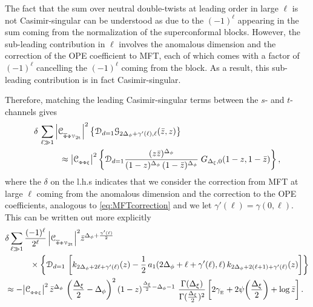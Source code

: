 \documentclass[11pt]{article}
\newcommand{\zb}{\bar{z}}
\newcommand{\Phib}{\overline{\Phi}}
\newcommand{\cope}[1]{\mathcal{C}_{_{#1}}}
\begin{document}
The fact that the sum over neutral double-twists at leading order in large $\ell$ is not Casimir-singular can be understood as due to the $(-1)^{\ell}$ appearing in the sum coming from the normalization of the superconformal blocks. However, the sub-leading contribution in $\ell$ involves the anomalous dimension and the correction of the OPE coefficient to MFT, each of which comes with a factor of $(-1)^{\ell}$ cancelling the $(-1)^{\ell}$ coming from the block. As a result, this sub-leading contribution is in fact Casimir-singular.

Therefore, matching the leading Casimir-singular terms between the $s$- and $t$-channels gives
%
\begin{equation}\label{eq:neutralcrossing}
\begin{split}
&\delta \, \sum_{\ell \gg 1} \abs{\cope{\Phib\Phi\mathcal{V}_{\mathrm{2t}}}}^{2}
\left\{ \mathcal{D}_{d=1}\mathcal{G}_{2\Delta_{\phi}+\gamma'(\ell),\ell}(\zb,z)  \right\}\\
& \qquad \quad 
\approx 
\abs{\cope{\Phi\Phi \xi}}^{2} \left\{\mathcal{D}_{d=1}\frac{(z\zb)^{\Delta_{\phi}}}{(1-z)^{\Delta_\phi} \, (1-\zb)^{\Delta_{\phi}}} \; G_{\Delta_{\xi},0}(1-z,1-\zb) \right\},
\end{split}
\end{equation}
%
where the $\delta$ on the l.h.s indicates that we consider the correction from MFT at large $\ell$ coming from the anomalous dimension and the correction to the OPE coefficients, analogous to \eqref{eq:MFTcorrection} and we let $\gamma'(\ell) = \gamma(0,\ell)$. This can be written  out more explicitly
%
\begin{equation}\label{eq:neutralcrossing_explicit}
\begin{split}
&\delta\sum_{\ell \gg 1} \frac{(-1)^\ell}{2^\ell} \,
  \abs{\cope{\Phib\Phi\mathcal{V}_{\mathrm{2t}}}}^{2}
  \zb^{\Delta_{\phi}+\frac{\gamma'(\ell)}{2}} \\
&  \qquad \quad 
\times \left\{ \mathcal{D}_{d=1} \, 
  \left[k_{2\Delta_{\phi}+2\ell+\gamma'(\ell)}(z)-\frac{1}{2}\, a_{1}(2\Delta_{\phi}+\ell+\gamma'(\ell),\ell) \, 
  k_{2\Delta_{\phi}+2(\ell+1)+\gamma'(\ell)}(z)\right] \right\} \\
&\approx 
  -\abs{\cope{\Phi\Phi \xi}}^{2} \, \zb^{\Delta_{\phi}} \, \left(\frac{\Delta_{\xi}}{2}-\Delta_{\phi}\right)^{2}(1-z)^{\frac{\Delta_{\xi}}{2}-\Delta_{\phi}-1}
  \ \frac{\Gamma(\Delta_{\xi})}{\Gamma(\frac{\Delta_{\xi}}{2})^{2}} 
  \left[2\gamma_{_\text{E}}+2\psi\bigg(\frac{\Delta_{\xi}}{2}\bigg)+\log\zb\right].
\end{split}
\end{equation}
\end{document}
